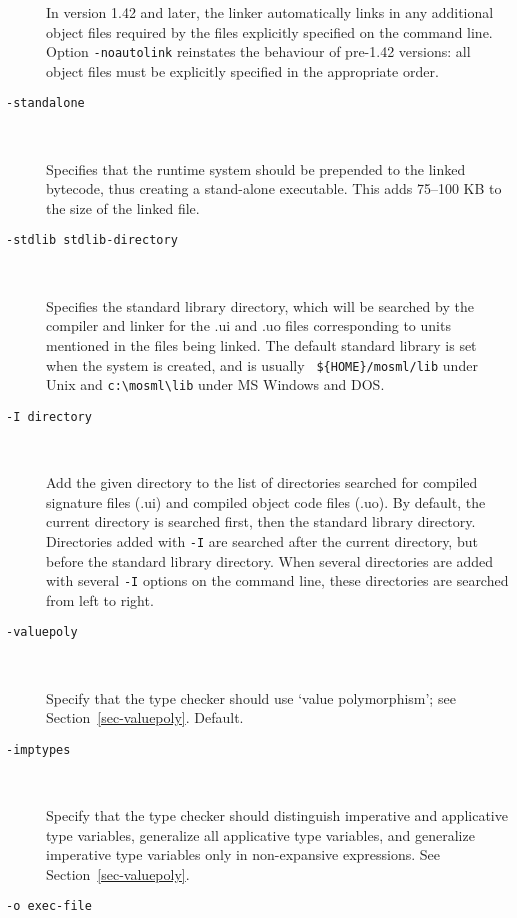 \documentclass[fleqn]{article}
\begin{document}
\begin{description}
  In version 1.42 and later, the linker automatically links in any
  additional object files required by the files explicitly specified
  on the command line.  Option {\tt -noautolink} reinstates the
  behaviour of pre-1.42 versions: all object files must be explicitly
  specified in the appropriate order.

\item[{\tt -standalone}]\mbox{ }
  
  Specifies that the runtime system should be prepended to the linked
  bytecode, thus creating a stand-alone executable.  This adds 75--100
  KB to the size of the linked file.

\item[{\tt -stdlib {\rm stdlib-directory}}]\mbox{ }

  Specifies the standard library directory, which will be searched by
  the compiler and linker for the .ui and .uo files corresponding to
  units mentioned in the files being linked.  The default standard
  library is set when the system is created, and is usually {\tt
    \$\{HOME\}/mosml/lib} under Unix and \verb#c:\mosml\lib# under MS
  Windows and DOS.

\item[{\tt -I {\rm directory}}]\mbox{ }

  Add the given directory to the list of directories searched for
  compiled signature files (.ui) and compiled object code files (.uo).
  By default, the current directory is searched first, then the
  standard library directory.  Directories added with {\tt -I} are
  searched after the current directory, but before the standard
  library directory.  When several directories are added with several
  {\tt -I} options on the command line, these directories are searched
  from left to right.

\item[{\tt -valuepoly}]\mbox{ }

  Specify that the type checker should use `value polymorphism'; see
  Section~\ref{sec-valuepoly}.  Default.

\item[{\tt -imptypes}]\mbox{ }

  Specify that the type checker should distinguish imperative and
  applicative type variables, generalize all applicative type
  variables, and generalize imperative type variables only in
  non-expansive expressions.  See Section~\ref{sec-valuepoly}.

\item[{\tt -o {\rm exec-file}}]\mbox{ }


\end{description}
\end{document}
